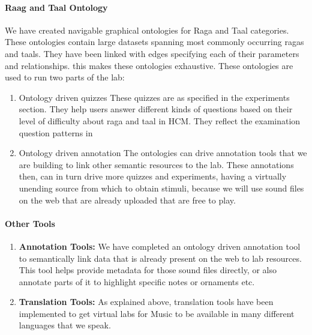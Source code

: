 \documentclass{tufte-handout}
\begin{document}
\paragraph{Raag and Taal Ontology}
We have created navigable graphical ontologies for Raga and Taal categories. These ontologies contain large datasets spanning most commonly occurring ragas and taals. They have been linked with edges specifying each of their parameters and relationships. this makes these ontologies exhaustive. These ontologies are used to run two parts of the lab:
\begin{enumerate}
\item Ontology driven quizzes
These quizzes are as specified in the experiments section. They help users answer different kinds of questions based on their level of difficulty about raga and taal in HCM. They reflect the examination question patterns in 
\item Ontology driven annotation
The ontologies can drive annotation tools that we are building to link other semantic resources to the lab. These annotations then, can in turn drive more quizzes and experiments, having a virtually unending source from which to obtain stimuli, because we will use sound files on the web that are already uploaded that are free to play.

\end{enumerate}

\paragraph{Other Tools}
\begin{enumerate}

\item \textbf{Annotation Tools: }
We have completed an ontology driven annotation tool to semantically link data that is already present on the web to lab resources. This tool helps provide metadata for those sound files directly, or also annotate parts of it to highlight specific notes or ornaments etc.

\item \textbf{Translation Tools:}
As explained above, translation tools have been implemented to get virtual labs for Music to be available in many different languages that we speak.
\end{enumerate}
\end{document}
